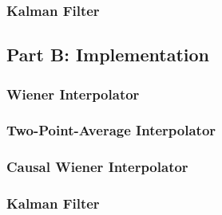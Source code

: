 \documentclass[11pt]{article}
\begin{document}
\subsubsection*{Kalman Filter}
\label{subsubsec:kalman}



\subsection*{Part B: Implementation}
\label{subsec:partB}


\subsubsection*{Wiener Interpolator}
\label{subsubsec:wienerimplementation}



\subsubsection*{Two-Point-Average Interpolator}
\label{subsubsec:avgimplementation}



\subsubsection*{Causal Wiener Interpolator}
\label{subsubsec:causalimplementation}



\subsubsection*{Kalman Filter}
\label{subsubsec:kalmanimplementation}


\end{document}
